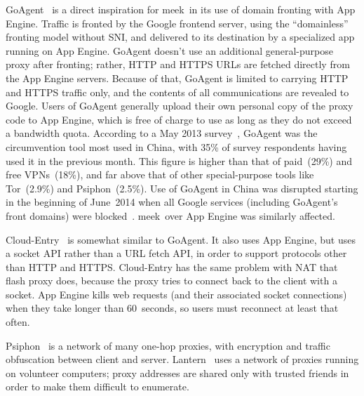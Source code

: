 \documentclass[conference]{IEEEtran}
\newcommand{\meek}{meek\xspace}
\begin{document}
GoAgent~\cite{goagent} is a direct inspiration for \meek\ in its use of
domain fronting with App Engine.
Traffic is fronted by the Google frontend server,
using the ``domainless'' fronting model without SNI,
and delivered to its destination by a specialized app running on App Engine.
GoAgent doesn't use an additional general-purpose proxy after fronting;
rather, HTTP and HTTPS URLs are fetched directly from the App Engine servers.
Because of that, GoAgent is limited to carrying HTTP and HTTPS traffic only,
and the contents of all communications are revealed to Google.
Users of GoAgent generally upload their own personal copy of the proxy code to App Engine,
which is free of charge to use as long as they do not exceed a bandwidth quota.
According to a May 2013 survey~\cite{collateral-freedom},
GoAgent was the circumvention tool most used in
China, with 35\% of survey respondents having used it in the previous month.
This figure is higher than that of paid~(29\%) and free VPNs~(18\%), and far
above that of other special-purpose tools like Tor~(2.9\%) and Psiphon~(2.5\%).
Use of GoAgent in China was disrupted starting in the beginning of June~2014
when all Google services (including GoAgent's front domains) were blocked~\cite{cn-google-block}.
\meek\ over App Engine was similarly affected.

Cloud-Entry~\cite{cloud-entry} is somewhat similar to GoAgent.
It also uses App Engine, but uses a socket API rather than a URL fetch API,
in order to support protocols other than HTTP and HTTPS.
Cloud-Entry has the same problem with NAT that flash proxy does,
because the proxy tries to connect back to the client with a socket.
App Engine kills web requests (and their associated socket connections)
when they take longer than 60~seconds,
so users must reconnect at least that often.

Psiphon~\cite{psiphon} is a network of many one-hop proxies,
with encryption and traffic obfuscation between client and server.
Lantern~\cite{lantern} uses a network of proxies running on volunteer computers;
proxy addresses are shared only with trusted friends in order to make them difficult to enumerate.

\end{document}
